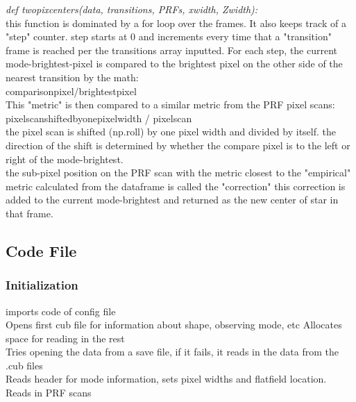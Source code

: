 \documentclass[12pt]{article}
\begin{document}
{\it \noindent def twopixcenters(data, transitions, PRFs, xwidth, Zwidth):}\\

  this function is dominated by a for loop over the frames. It also keeps
  track of a "step" counter. step starts at 0 and increments every time that
  a "transition" frame is reached per the transitions array inputted. For each
  step, the current mode-brightest-pixel is compared to the brightest pixel on
  the other side of the nearest transition by the math:\\
    comparisonpixel/brightestpixel\\
  This "metric" is then compared to a similar metric from the PRF pixel scans:\\
    pixelscanshiftedbyonepixelwidth / pixelscan\\
  the pixel scan is shifted (np.roll) by one pixel width and divided by itself.
  the direction of the shift is determined by whether the compare pixel is to
  the left or right of the mode-brightest.\\
  the sub-pixel position on the PRF scan with the metric closest to the
  "empirical" metric calculated from the dataframe is called the "correction"
  this correction is added to the current mode-brightest and returned as the
  new center of star in that frame.\\


\subsection{Code File}

\subsubsection{Initialization}

imports code of config file\\

Opens first cub file for information about shape, observing mode, etc
Allocates space for reading in the rest\\

Tries opening the data from a save file, if it fails, it reads in the data from
the .cub files\\

Reads header for mode information, sets pixel widths and flatfield location.\\

Reads in PRF scans\\
\end{document}
